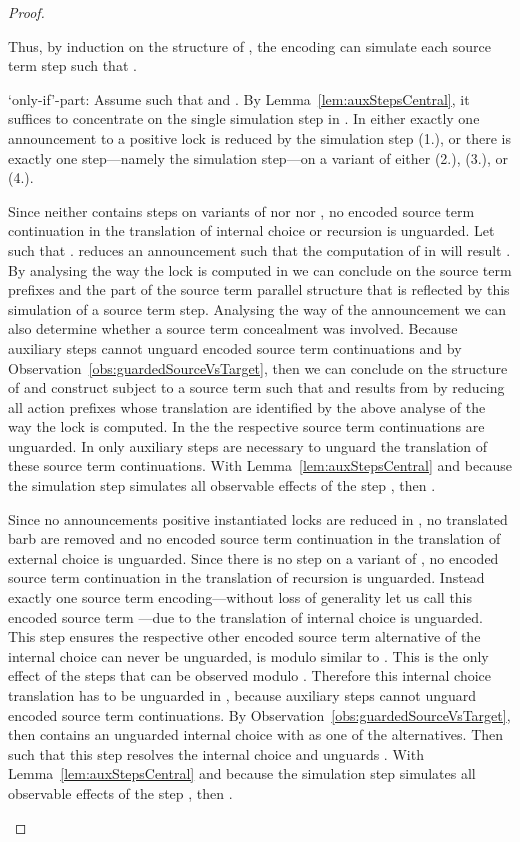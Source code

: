 \documentclass[]{eptcs}
\begin{document}
\begin{proof}
\begin{compactitem}
			Thus, by induction on the structure of , the encoding  can simulate each source term step  such that .
		\item[`only-if'-part:] Assume  such that  and . By Lemma~\ref{lem:auxStepsCentral}, it suffices to concentrate on the single simulation step in . In  either exactly one announcement \wrt to a positive lock is reduced by the simulation step (1.), or there is exactly one step---namely the simulation step---on a variant of either  (2.),  (3.), or  (4.).
			\begin{compactenum}
				\item Since  neither contains steps on variants of  nor  nor , no encoded source term continuation in the translation of internal choice or recursion is unguarded. Let  such that .  reduces an announcement  such that the computation of  in  will result .	By analysing the way the lock  is computed in  we can conclude on the source term prefixes and the part of the source term parallel structure that is reflected by this simulation of a source term step. Analysing the way of the announcement we can also determine whether a source term concealment was involved.
					Because auxiliary steps cannot unguard encoded source term continuations and by Observation~\ref{obs:guardedSourceVsTarget}, then we can conclude on the structure of  and construct subject to  a source term  such that  and  results from  by reducing all action prefixes whose translation are identified by the above analyse of the way the lock  is computed. In the  the respective source term continuations are unguarded. In  only auxiliary steps are necessary to unguard the translation of these source term continuations.
					With Lemma~\ref{lem:auxStepsCentral} and because the simulation step simulates all observable effects of the step , then .
				\item Since no announcements \wrt positive instantiated locks are reduced in , no translated barb are removed and no encoded source term continuation in the translation of external choice is unguarded. Since there is no step on a variant of , no encoded source term continuation in the translation of recursion is unguarded. Instead exactly one source term encoding---without loss of generality let us call this encoded source term ---due to the translation of internal choice is unguarded. This step ensures the respective other encoded source term alternative of the internal choice can never be unguarded, \ie is modulo  similar to . This is the only effect of the steps  that can be observed modulo . Therefore this internal choice translation has to be unguarded in , because auxiliary steps cannot unguard encoded source term continuations. By Observation~\ref{obs:guardedSourceVsTarget}, then  contains an unguarded internal choice with  as one of the alternatives. Then  such that this step resolves the internal choice and unguards . With Lemma~\ref{lem:auxStepsCentral} and because the simulation step simulates all observable effects of the step , then .

\end{compactenum}
\end{compactitem}
\end{proof}
\end{document}
